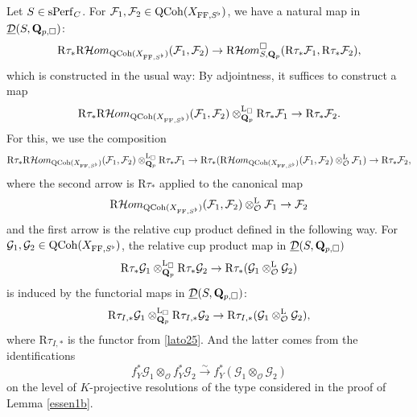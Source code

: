 \documentclass[10pt]{amsart}
\let\cal\mathcal
\theoremstyle{definition}
\theoremstyle{remark}
\newcommand{\Hhom}{{\cal Hom}}
\newcommand{\LL}{\operatorname{L} }
\newcommand{\FF}{\operatorname{FF} }
\newcommand{\sff}{{\mathcal{F}}}
\newcommand{\sg}{{\mathcal{G}}}
\newcommand{\so}{{\mathcal O}}
\newcommand{\sd}{{\mathcal{D}}}
\numberwithin{equation}{section}
\def\R{{\mathrm R}}
\def\Q{{\bf Q}} \def\Z{{\bf Z}}
\numberwithin{equation}{section}
\begin{document}
  Let $S\in {\rm sPerf}_C$. For  $\sff_1,\sff_2\in {\rm QCoh}(X_{\FF, S^{\flat}})$, we have a natural map in $\underline{\sd}(S,\Q_{p,\Box})$:
\begin{equation}\label{maybe1-52}
\R\tau_*\R\Hhom_{{\rm QCoh}(X_{\FF,S^{\flat}})}(\sff_1,\sff_2)\to \R\Hhom^{\Box}_{S,\Q_{p}}(\R\tau_*\sff_1,\R\tau_*\sff_2),
\end{equation}
which is  constructed in the usual way: 
By adjointness, it suffices to construct a map
$$
\R\tau_*\R\Hhom_{{\rm QCoh}(X_{\FF,S^{\flat}})}(\sff_1,\sff_2)\otimes^{\LL_{\Box}}_{{\Q}_p}\R\tau_*\sff_1\to \R\tau_*\sff_2.
$$
For this, we use the composition 
$$
\R\tau_*\R\Hhom_{{\rm QCoh}(X_{\FF,S^{\flat}})}(\sff_1,\sff_2)\otimes^{\LL_{\Box}}_{{\Q}_p}\R\tau_*\sff_1\to \R\tau_*(\R\Hhom_{{\rm QCoh}(X_{\FF,S^{\flat}})}(\sff_1,\sff_2)\otimes^{\LL}_{\so}\sff_1)\to\R\tau_*\sff_2,
$$
where  the second arrow is $\R\tau_*$ applied to the canonical map
$$
\R\Hhom_{{\rm QCoh}(X_{\FF,S^{\flat}})}(\sff_1,\sff_2)\otimes^{\LL}_{\so}\sff_1\to \sff_2
$$
and the first arrow is the relative cup product defined in the following way. For  $\sg_1,\sg_2\in {\rm QCoh}(X_{\FF, S^{\flat}})$,  the relative cup product map in $\underline{\sd}(S,\Q_{p,\Box})$
\begin{equation}\label{maybe3}
\R\tau_*\sg_1\otimes^{\LL_{\Box}}_{{\Q}_p}\R\tau_*\sg_2\to \R\tau_*(\sg_1\otimes^{\LL}_{\so}\sg_2)
\end{equation}
is induced by the functorial maps  in $\underline{\sd}(S,\Q_{p,\Box})$:
\begin{equation*}
\R\tau_{I,*}\sg_1\otimes^{\LL_{\Box}}_{{\Q}_p}\R\tau_{I,*}\sg_2\to \R\tau_{I,*}(\sg_1\otimes^{\LL}_{\so}\sg_2), 
\end{equation*}
where $\R\tau_{I,*}$ is the functor from \eqref{lato25}. And the latter comes from the 
identifications
$$
f_Y^*\sg_1\otimes_{\so} f_Y^*\sg_2 \stackrel{\sim}{\to} f_Y^*(\sg_1\otimes_{\so} \sg_2)
$$
on the level of $K$-projective resolutions of the type considered in the proof of Lemma \ref{essen1b}. 
\end{document}
